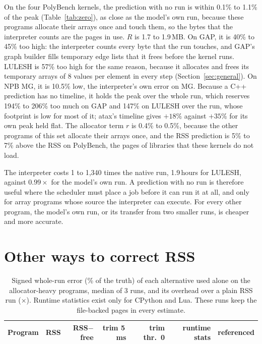 \documentclass[11pt]{article}
\newcommand{\secref}[1]{Section~\ref{#1}}
\newcommand{\tabref}[1]{Table~\ref{#1}}
\begin{document}
On the four PolyBench kernels, the prediction with no run is within 0.1\% to 1.1\% of the peak (\tabref{tab:zero}),
as close as the model's own run, because these programs allocate their arrays once and touch them, so the bytes that
the interpreter counts are the pages in use. $R$ is 1.7 to 1.9\,MB. On GAP, it is 40\% to 45\% too high: the
interpreter counts every byte that the run touches, and GAP's graph builder fills temporary edge lists that it frees
before the kernel runs. LULESH is 57\% too high for the same reason, because it allocates and frees its temporary
arrays of 8 values per element in every step (\secref{sec:general}). On NPB MG, it is 10.5\% low,
the interpreter's own error on MG. Because a C++ prediction has no timeline, it holds the peak over the whole run,
which reserves 194\% to 206\% too much on GAP and 147\% on LULESH over the run, whose footprint is low for most of it;
atax's timeline gives
$+18\%$ against $+35\%$ for its own peak held flat. The allocator term $r$ is 0.4\% to 0.5\%, because the other
programs of this set allocate their arrays once, and the RSS prediction is 5\% to 7\% above the RSS on PolyBench, the
pages of libraries that these kernels do not load.

The interpreter costs 1 to 1{,}340 times the native run, 1.9\,hours for LULESH, against $0.99\times$ for the model's own run. A prediction
with no run is therefore useful where the scheduler must place a job before it can run it at all, and only for array
programs whose source the interpreter can execute. For every other program, the model's own run, or its transfer from
two smaller runs, is cheaper and more accurate.

\section{Other ways to correct RSS}
\label{sec:options}

\begin{table}[t]
\centering
\small
\caption{Signed whole-run error (\% of the truth) of each alternative used alone on the allocator-heavy programs,
median of 3 runs, and its overhead over a plain RSS run ($\times$). Runtime statistics exist only for CPython and Lua.
These runs keep the file-backed pages in every estimate.}
\label{tab:options}
\setlength{\tabcolsep}{5pt}
\begin{tabular}{lrrrrrr}
\toprule
Program & RSS & RSS$-$free & trim 5\,ms & trim thr.\ 0 & runtime stats & referenced \\
\midrule

\bottomrule
\end{tabular}
\end{table}
\end{document}
